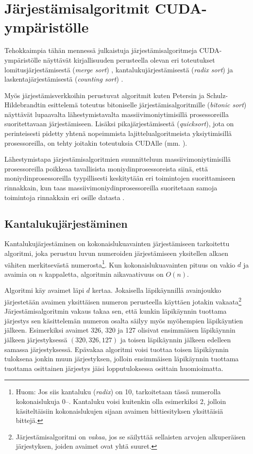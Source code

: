 \documentclass[a4paper,11pt]{article}
\newcommand{\engl}[1]{\foreignlanguage{english}{\em #1}}
\begin{document}
\section{Järjestämisalgoritmit CUDA-ympäristölle}

Tehokkaimpia tähän mennessä julkaistuja järjestämisalgoritmeja CUDA-ym\-pä\-ris\-töl\-le näyttävät kirjallisuuden perusteella olevan eri toteutukset lomitusjärjestämisestä (\engl{merge sort}) \cite{satish2009}, kantalukujärjestämisestä (\engl{radix sort}) \cite{satish2009} \cite{merrill2011} ja laskentajärjestämisestä (\engl{counting sort}) \cite{kolonias2011}.

Myös järjestämisverkkoihin perustuvat algoritmit kuten Petersin ja Schulz-Hildebrandtin \cite{peters2012gems} esittelemä toteutus bitoniselle järjestämisalgoritmille (\engl{bitonic sort}) näyttävät lupaavalta lähestymistavalta massiivimoniytimisillä prosessoreilla suoritettavaan järjestämiseen. Lisäksi pikajärjestämisestä (\engl{quicksort}), jota on perinteisesti pidetty yhtenä nopeimmista lajittelualgoritmeista yksiytimisillä prosessoreilla, on tehty joitakin toteutuksia CUDAlle (mm. \cite{cederman2009}).

Lähestymistapa järjestämisalgoritmien suunnitteluun massiivimoniytimisillä prosessoreilla poikkeaa tavallisista moniydinprosessoreista siinä, että moniydinprosessoreilla tyypillisesti keskitytään eri toimintojen suorittamiseen rinnakkain, kun taas massiivimoniydinprosessoreilla suoritetaan samoja toimintoja rinnakkain eri osille datasta \cite{satish2009}.

\subsection{Kantalukujärjestäminen}

Kantalukujärjestäminen on kokonaislukuavainten järjestämiseen tarkoitettu algoritmi, joka perustuu luvun numeroiden järjestämiseen yksitellen alkaen vähiten merkitsevästä numerosta\footnote{Huom: Jos siis kantaluku (\engl{radix}) on 10, tarkoitetaan tässä numerolla kokonaislukuja 0\thinspace--. Kantaluku voisi kuitenkin olla esimerkiksi 2, jolloin käsiteltäisiin kokonaislukujen sijaan avaimen bittiesityksen yksittäisiä bittejä.}. Kun kokonaislukuavainten pituus on vakio $d$ ja avaimia on $n$ kappaletta, algoritmin aikavaativuus on $O(n)$.

Algoritmi käy avaimet läpi $d$ kertaa. Jokaisella läpikäynnillä avainjoukko järjestetään avaimen yksittäisen numeron perusteella käyttäen jotakin vakaata\footnote{Järjestämisalgoritmi on \emph{vakaa}, jos se säilyttää sellaisten arvojen alkuperäisen järjestyksen, joiden avaimet ovat yhtä suuret.} Järjestämisalgoritmin vakaus takaa sen, että kunkin läpikäynnin tuottama järjestys sen käsittelemän numeron osalta säilyy myös myöhempien läpikäyntien jälkeen. Esimerkiksi avaimet 326, 320 ja 127 olisivat ensimmäisen läpikäynnin jälkeen järjestyksessä $(320, 326, 127)$ ja toisen läpikäynnin jälkeen edelleen samassa järjestyksessä. Epävakaa algoritmi voisi tuottaa toisen läpikäynnin tuloksena jonkin muun järjestyksen, jolloin ensimmäisen läpikäynnin tuottama tuottama osittainen järjestys jäisi lopputuloksessa osittain huomioimatta.
\end{document}

